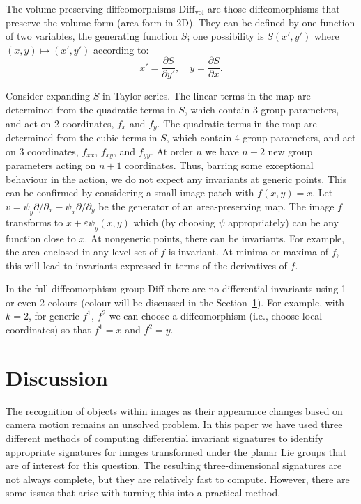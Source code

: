 \documentclass{artjlt}
\begin{document}
The volume-preserving diffeomorphisms $\mathrm{Diff}_{\mathrm{vol}}$ are those diffeomorphisms that preserve the volume form (area form in 2D). They can be defined by one function of two variables, the generating function $S$; one possibility is $S(x',y')$ where $(x,y)\mapsto(x',y')$ according to:
$$ x'=\frac{\partial S}{\partial y'},\quad y = \frac{\partial S}{\partial x}.$$

Consider expanding $S$ in Taylor series. The linear terms in the map are determined from the quadratic terms in $S$, which contain 3 group parameters, and act on 2 coordinates, $f_x$ and $f_y$.  The quadratic terms in the map are determined from the cubic terms in $S$, which contain 4 group parameters, and act on 3 coordinates, $f_{xx}$, $f_{xy}$, and $f_{yy}$. At order $n$ we have $n+2$ new group parameters acting on $n+1$ coordinates. Thus, barring some exceptional behaviour in the action, we do not expect any invariants at generic points. This can be confirmed by considering a small image patch with $f(x,y)=x.$ Let $v=\psi_y\partial/\partial_x - \psi_x\partial/\partial_y$ be the generator of an area-preserving map. The image $f$ transforms to $x + \varepsilon \psi_y(x,y)$ which (by choosing $\psi$ appropriately) can be any function close to $x$.
At nongeneric points, there can be invariants. For example, the area enclosed in any level set of $f$ is invariant. At minima or maxima of $f$, this will lead to invariants expressed in terms of the derivatives of $f$.

In the full diffeomorphism group $\mathrm{Diff}$ there are no differential invariants using 1 or even 2 colours (colour will be discussed in the Section~\ref{sec:colour}). For example, with $k=2$, for generic $f^1$, $f^2$ we can choose a diffeomorphism (i.e., choose local coordinates) so that $f^1=x$ and $f^2=y$.

\section{Discussion}\label{sec:colour}


The recognition of objects within images as their appearance changes based on camera motion remains an unsolved problem. In this paper we have used three different methods of computing differential invariant signatures to identify appropriate signatures for images transformed under the planar Lie groups that are of interest for this question. The resulting three-dimensional signatures are not always complete, but they are relatively fast to compute. However, there are some issues that arise with turning this into a practical method. 
\end{document}
